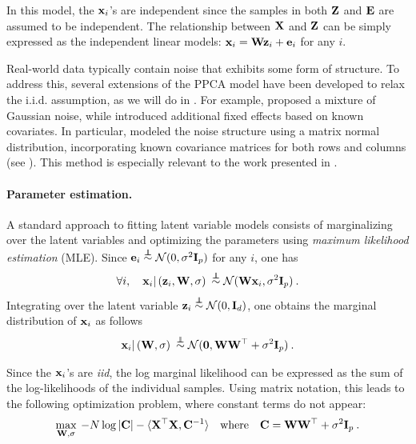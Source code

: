 In this model, the ${\mathbf{x}}_i$'s are independent since the samples in both ${\mathbf{Z}}$ and ${\mathbf{E}}$ are assumed to be independent. The relationship between ${\mathbf{X}}$ and ${\mathbf{Z}}$ can be simply expressed as the independent linear models: ${\mathbf{x}}_i = {\mathbf{W}} {\mathbf{z}}_i + {\mathbf{e}}_i$ for any $i$.

\begin{remark}
    Real-world data typically contain noise that exhibits some form of structure. To address this, several extensions of the PPCA model have been developed to relax the i.i.d. assumption, as we will do in . For example, \cite{zhao2014robust} proposed a mixture of Gaussian noise, while \cite{kalaitzis2011residual} introduced additional fixed effects based on known covariates. In particular, \cite{allen2014generalized} modeled the noise structure using a matrix normal distribution, incorporating known covariance matrices for both rows and columns (see ). This method is especially relevant to the work presented in .
\end{remark}


\paragraph{Parameter estimation.} A standard approach to fitting latent variable models consists of marginalizing over the latent variables and optimizing the parameters using \emph{maximum likelihood estimation} (MLE). Since ${\mathbf{e}}_i \stackrel{\perp\!\!\!\!\perp}{\sim} \mathcal{N}(0, \sigma^2 {\mathbf{I}}_p)$ for any $i$, one has
\begin{align}\label{eq:ppca_likelihood}
    \forall i, \quad {\mathbf{x}}_i | \left( {\mathbf{z}}_i, {\mathbf{W}}, \sigma \right) \: \stackrel{\perp\!\!\!\!\perp}{\sim} \mathcal{N}({\mathbf{W}} {\mathbf{x}}_i, \sigma^2 {\mathbf{I}}_p) \:.
\end{align}
Integrating over the latent variable ${\mathbf{z}}_i \stackrel{\perp\!\!\!\!\perp}{\sim} \mathcal{N}(0, {\mathbf{I}}_d)$, one obtains the marginal distribution of ${\mathbf{x}}_i$ as follows
\begin{align}\label{eq:ppca_marginal}
    {\mathbf{x}}_i | \left( {\mathbf{W}}, \sigma \right) \: \stackrel{\perp\!\!\!\!\perp}{\sim} \mathcal{N}(\bm{0}, {\mathbf{W}} {\mathbf{W}}^\top + \sigma^2 {\mathbf{I}}_p) \:.
\end{align}

Since the ${\mathbf{x}}_i$'s are \emph{iid}, the log marginal likelihood can be expressed as the sum of the log-likelihoods of the individual samples. Using matrix notation, this leads to the following optimization problem, where constant terms do not appear:
\begin{align}
    \max_{{\mathbf{W}}, \sigma} \: -N \log |{\mathbf{C}}| - \langle {\mathbf{X}}^\top {\mathbf{X}}, {\mathbf{C}}^{-1} \rangle \quad \text{where} \quad {\mathbf{C}} = {\mathbf{W}} {\mathbf{W}}^\top + \sigma^2 {\mathbf{I}}_p \:.
\end{align}


